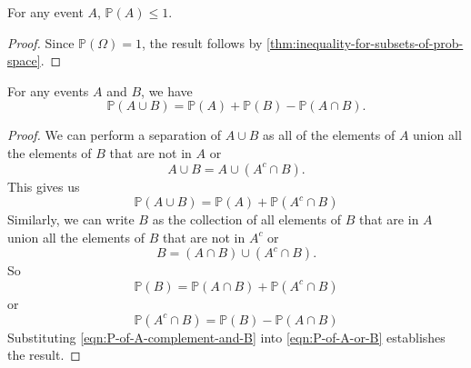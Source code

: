 \begin{corollary}
    For any event \( A \), \( \mathbb{P} \left( A \right) \le 1 \).
\end{corollary}
\begin{proof}
    Since \( \mathbb{P} \left( \Omega \right) =1 \), the result follows by \cref{thm:inequality-for-subsets-of-prob-space}.
\end{proof}

\begin{theorem}\label{thm:P-of-A-union-B}
    For any events \( A \) and \( B \), we have 
    \[ \mathbb{P} \left( A \cup B \right) = \mathbb{P} \left( A \right) + \mathbb{P} \left( B \right) - \mathbb{P} \left( A \cap B \right). \]
\end{theorem}
\begin{proof}
    We can perform a separation of \( A \cup B \) as all of the elements of \( A \) union all the elements of \( B \) that are not in \( A \) or 
    \[ A \cup B = A \cup \left( A^{c} \cap B \right) .\]
    This gives us 
    \begin{equation}\label{eqn:P-of-A-or-B}
        \mathbb{P} \left( A \cup B \right) = \mathbb{P} \left( A \right) + \mathbb{P} \left( A^{c} \cap B \right)
    \end{equation}
    Similarly, we can write \( B \) as the collection of all elements of \( B \) that are in \( A \) union all the elements of \( B \) that are not in \( A^{c} \) or 
    \[ B = \left( A \cap B \right) \cup \left( A^{c} \cap B \right) .\]
    So 
    \[ \mathbb{P} \left( B \right) = \mathbb{P} \left( A \cap B \right) + \mathbb{P} \left( A^{c} \cap B \right) \]
    or 
    \begin{equation}\label{eqn:P-of-A-complement-and-B}
        \mathbb{P} \left( A^{c} \cap B \right) = \mathbb{P} \left( B \right) - \mathbb{P} \left( A \cap B \right) 
    \end{equation}
    Substituting \cref{eqn:P-of-A-complement-and-B} into \cref{eqn:P-of-A-or-B} establishes the result.
\end{proof}

